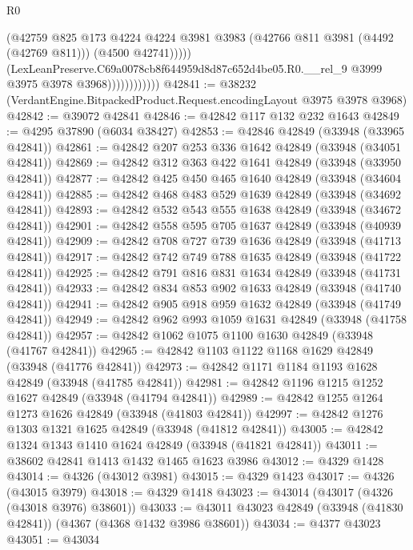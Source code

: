 \begin{lexlean}{R0}
\begin{coremodule}
                                (@42759
                                  @825
                                  @173
                                  @4224
                                  @4224
                                  @3981
                                  @3983
                                  (@42766 @811 @3981 (@4492 (@42769 @811)))
                                  (@4500 @42741)))))
                          (LexLeanPreserve.C69a0078cb8f644959d8d87c652d4be05.R0.__rel_9
                            @3999
                            @3975
                            @3978
                            @3968))))))))))))
@42841 := @38232 (VerdantEngine.BitpackedProduct.Request.encodingLayout @3975 @3978 @3968)
@42842 := @39072 @42841
@42846 := @42842 @117 @132 @232 @1643
@42849 := @4295 @37890 (@6034 @38427)
@42853 := @42846 @42849 (@33948 (@33965 @42841))
@42861 := @42842 @207 @253 @336 @1642 @42849 (@33948 (@34051 @42841))
@42869 := @42842 @312 @363 @422 @1641 @42849 (@33948 (@33950 @42841))
@42877 := @42842 @425 @450 @465 @1640 @42849 (@33948 (@34604 @42841))
@42885 := @42842 @468 @483 @529 @1639 @42849 (@33948 (@34692 @42841))
@42893 := @42842 @532 @543 @555 @1638 @42849 (@33948 (@34672 @42841))
@42901 := @42842 @558 @595 @705 @1637 @42849 (@33948 (@40939 @42841))
@42909 := @42842 @708 @727 @739 @1636 @42849 (@33948 (@41713 @42841))
@42917 := @42842 @742 @749 @788 @1635 @42849 (@33948 (@41722 @42841))
@42925 := @42842 @791 @816 @831 @1634 @42849 (@33948 (@41731 @42841))
@42933 := @42842 @834 @853 @902 @1633 @42849 (@33948 (@41740 @42841))
@42941 := @42842 @905 @918 @959 @1632 @42849 (@33948 (@41749 @42841))
@42949 := @42842 @962 @993 @1059 @1631 @42849 (@33948 (@41758 @42841))
@42957 := @42842 @1062 @1075 @1100 @1630 @42849 (@33948 (@41767 @42841))
@42965 := @42842 @1103 @1122 @1168 @1629 @42849 (@33948 (@41776 @42841))
@42973 := @42842 @1171 @1184 @1193 @1628 @42849 (@33948 (@41785 @42841))
@42981 := @42842 @1196 @1215 @1252 @1627 @42849 (@33948 (@41794 @42841))
@42989 := @42842 @1255 @1264 @1273 @1626 @42849 (@33948 (@41803 @42841))
@42997 := @42842 @1276 @1303 @1321 @1625 @42849 (@33948 (@41812 @42841))
@43005 := @42842 @1324 @1343 @1410 @1624 @42849 (@33948 (@41821 @42841))
@43011 := @38602 @42841 @1413 @1432 @1465 @1623 @3986
@43012 := @4329 @1428
@43014 := @4326 (@43012 @3981)
@43015 := @4329 @1423
@43017 := @4326 (@43015 @3979)
@43018 := @4329 @1418
@43023 := @43014 (@43017 (@4326 (@43018 @3976) @38601))
@43033 := @43011 @43023 @42849 (@33948 (@41830 @42841)) (@4367 (@4368 @1432 @3986 @38601))
@43034 := @4377 @43023
@43051 := @43034

\end{coremodule}
\end{lexlean}
